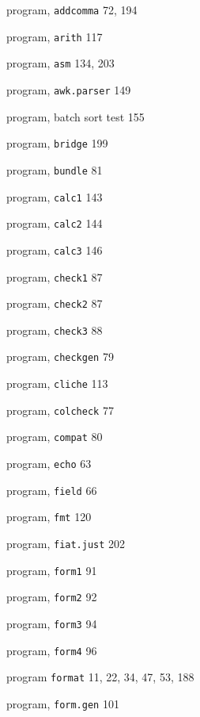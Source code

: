 \begin{multicols}{3}
\hangindent=3pc  program, \verb'addcomma' 72, 194

\hangindent=3pc  program, \verb'arith' 117

\hangindent=3pc  program, \verb'asm' 134, 203

\hangindent=3pc  program, \verb'awk.parser' 149

\hangindent=3pc  program, batch sort test 155

\hangindent=3pc  program, \verb'bridge' 199

\hangindent=3pc  program, \verb'bundle' 81

\hangindent=3pc  program, \verb'calc1' 143

\hangindent=3pc  program, \verb'calc2' 144

\hangindent=3pc  program, \verb'calc3' 146

\hangindent=3pc  program, \verb'check1' 87

\hangindent=3pc  program, \verb'check2' 87

\hangindent=3pc  program, \verb'check3' 88

\hangindent=3pc  program, \verb'checkgen' 79

\hangindent=3pc  program, \verb'cliche' 113

\hangindent=3pc  program, \verb'colcheck' 77

\hangindent=3pc  program, \verb'compat' 80

\hangindent=3pc  program, \verb'echo' 63

\hangindent=3pc  program, \verb'field' 66

\hangindent=3pc  program, \verb'fmt' 120

\hangindent=3pc  program, \verb'fiat.just' 202

\hangindent=3pc  program, \verb'form1' 91

\hangindent=3pc  program, \verb'form2' 92

\hangindent=3pc  program, \verb'form3' 94

\hangindent=3pc  program, \verb'form4' 96

\hangindent=3pc  program \verb'format' 11, 22, 34, 47, 53, 188

\hangindent=3pc  program, \verb'form.gen' 101


\end{multicols}
